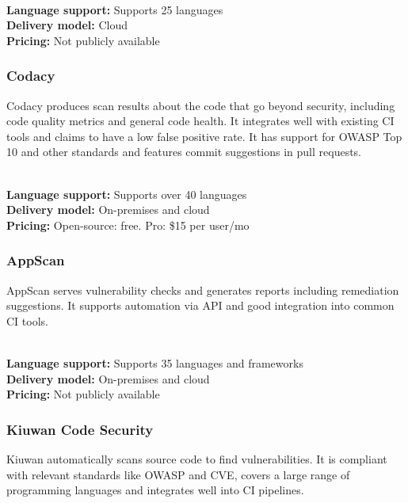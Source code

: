 \documentclass[conference]{IEEEtran}
\begin{document}
\noindent\\
\textbf{Language support:} Supports 25 languages
\noindent\\
\textbf{Delivery model:} Cloud
\noindent\\
\textbf{Pricing:} Not publicly available
\\

\noindent
\subsubsection{Codacy \cite{sast4}}

Codacy produces scan results about the code that go beyond security, including code quality metrics and general code health. It integrates well with existing CI tools and claims to have a low false positive rate. It has support for OWASP Top 10 and other standards and features commit suggestions in pull requests.

\noindent\\
\textbf{Language support:} Supports over 40 languages
\noindent\\
\textbf{Delivery model:} On-premises and cloud
\noindent\\
\textbf{Pricing:} Open-source: free. Pro: \$15 per user/mo
\\

\noindent
\subsubsection{AppScan \cite{sast5}}

AppScan serves vulnerability checks and generates reports including remediation suggestions. It supports automation via API and good integration into common CI tools.

\noindent\\
\textbf{Language support:} Supports 35 languages and frameworks
\noindent\\
\textbf{Delivery model:} On-premises and cloud
\noindent\\
\textbf{Pricing:} Not publicly available
\\


\noindent
\subsubsection{Kiuwan Code Security \cite{sast0}}

Kiuwan automatically scans source code to find vulnerabilities. It is compliant with relevant standards like OWASP and CVE, covers a large range of programming languages and integrates well into CI pipelines.
\end{document}
